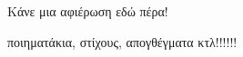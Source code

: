 
\begin{dedication} 

\flushright
Κάνε μια αφιέρωση εδώ πέρα!

ποιηματάκια, στίχους, απογθέγματα κτλ!!!!!!

\end{dedication}

